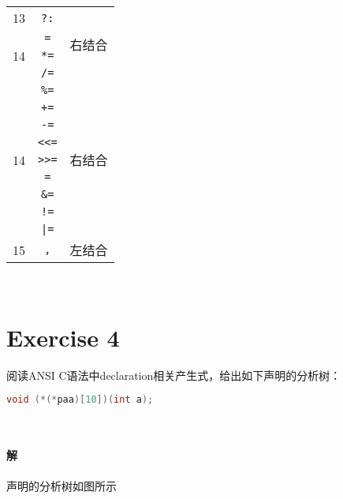 \documentclass{article}
\begin{document}
\begin{longtable}{|c|c|c|}
    13 & \texttt{?:} & \multirow{4}{*}{右结合} \\ \cline{1-2}
    \multirow{3}{*}{14} 
     & \texttt{=} &  \\ \cline{2-2}
     & \texttt{*=} &  \\ \cline{2-2}
     & \texttt{/=} &  \\ \cline{2-2}
    \multirow{9}{*}{14}
     & \texttt{\%=} & \multirow{9}{*}{右结合} \\ \cline{2-2}
     & \texttt{+=} &  \\ \cline{2-2}
     & \texttt{-=} &  \\ \cline{2-2}
     & \texttt{{<}<=} & \\ \cline{2-2}
     & \texttt{{>}>=} &\\ \cline{2-2}
     & \texttt{=} &  \\ \cline{2-2}
     & \texttt{\&=} &  \\ \cline{2-2}
     & \texttt{!=} &  \\ \cline{2-2}
     & \texttt{|=} &  \\ \hline
    15 & \texttt{,} & 左结合 \\ \hline
\end{longtable}

\\

\section{Exercise 4}
阅读ANSI C语法中declaration相关产生式，给出如下声明的分析树：
\begin{lstlisting}[language = C++, 
         keywordstyle=\bfseries\color{blue!70},
         commentstyle=\color{red!40!green!60!blue},
         frame=shadowbox,
         rulesepcolor=\color{red!20!green!30!blue!20},
         basicstyle=\ttfamily]
  void (*(*paa)[10])(int a);
\end{lstlisting}
\\

\paragraph{解}
声明的分析树如图所示
\end{document}

